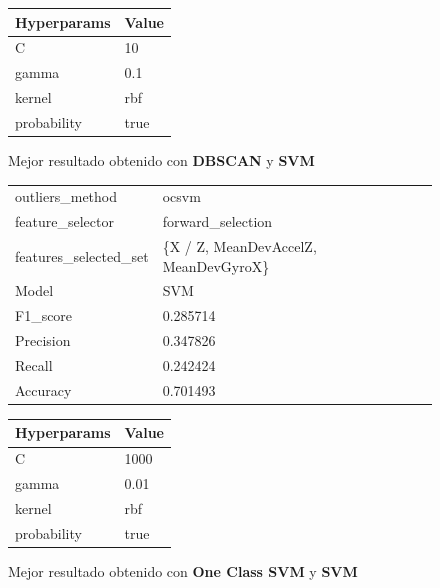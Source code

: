 \begin{appendices}
\begin{figure}[htb]
			\begin{tabular}{ll}
				\toprule
				Hyperparams & Value \\
				\midrule
						  C &    10 \\
					  gamma &   0.1 \\
					 kernel &   rbf \\
				probability &  true \\
				\bottomrule
			\end{tabular}
			\caption{Mejor resultado obtenido con \textbf{DBSCAN} y \textbf{SVM}}
			\label{table:19}
		\end{figure}

		\begin{figure}[htb]
			\centering
			\begin{tabular}{ll}
				\toprule
					  outliers\_method &                                ocsvm \\
					 feature\_selector &                    forward\_selection \\
				features\_selected\_set & \{X / Z, MeanDevAccelZ, MeanDevGyroX\} \\
								Model &                                  SVM \\
						F1\_score &                             0.285714 \\
					   Precision &                             0.347826 \\
						  Recall &                             0.242424 \\
						Accuracy &                             0.701493 \\
				\bottomrule
			\end{tabular}
			\newline
			\newline

			\begin{tabular}{ll}
				\toprule
				Hyperparams & Value \\
				\midrule
						  C &  1000 \\
					  gamma &  0.01 \\
					 kernel &   rbf \\
				probability &  true \\
				\bottomrule
			\end{tabular}
			\caption{Mejor resultado obtenido con \textbf{One Class SVM} y \textbf{SVM}}
			\label{table:19}
		\end{figure}


\end{appendices}

